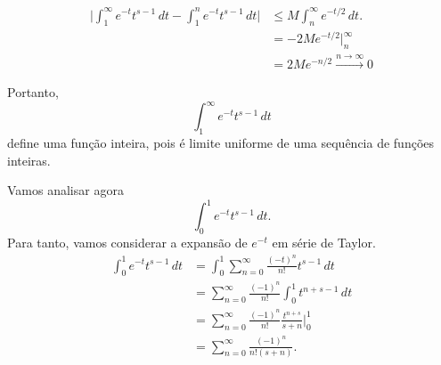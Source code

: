     \begin{align*}
        \Big | \int_{1}^{\infty}e^{-t}t^{s-1} \, dt - \int_{1}^{n}e^{-t}t^{s-1} \, dt \Big | &\leq M \int_{n}^{\infty}e^{-t/2} \, dt.\\
        &= -2M e^{-t/2} \Big |_{n}^{\infty} \\
        &= 2M e^{-n/2} \xrightarrow{n \to \infty} 0
    \end{align*}
    
    Portanto,
    \[
    \int_{1}^{\infty}e^{-t}t^{s-1} \, dt
    \]
    define uma função inteira, pois é limite uniforme de uma sequência de funções inteiras.
    
    Vamos analisar agora 
    \[
    \int_{0}^{1}e^{-t}t^{s-1} \, dt.
    \]
    Para tanto, vamos considerar a expansão de $e^{-t}$ em série de Taylor. 
    \begin{align*}
        \int_{0}^{1}e^{-t}t^{s-1} \, dt &=  \int_{0}^{1}\sum_{n=0}^{\infty}\frac{(-t)^n}{n!} t^{s-1} \, dt \\
        &= \sum_{n=0}^{\infty} \frac{(-1)^n}{n!}\int_{0}^{1}t^{n + s-1} \, dt \\
        &= \sum_{n=0}^{\infty} \frac{(-1)^n}{n!}\frac{t^{n + s}}{s+n} \Big |_{0}^{1} \\
        &= \sum_{n=0}^{\infty} \frac{(-1)^n}{n!(s+n)}.
    \end{align*}
    
    
    
    
    
    
    
    
    
    
    
